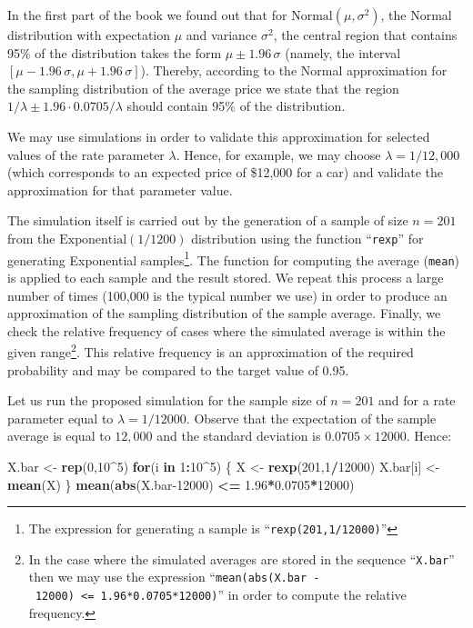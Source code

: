 \documentclass[]{krantz}
\makeatletter
\newenvironment{Shaded}{\begin{snugshade}}{\end{snugshade}}
\newcommand{\ControlFlowTok}[1]{\textcolor[rgb]{0.13,0.29,0.53}{\textbf{#1}}}
\newcommand{\DecValTok}[1]{\textcolor[rgb]{0.00,0.00,0.81}{#1}}
\newcommand{\FloatTok}[1]{\textcolor[rgb]{0.00,0.00,0.81}{#1}}
\newcommand{\KeywordTok}[1]{\textcolor[rgb]{0.13,0.29,0.53}{\textbf{#1}}}
\newcommand{\NormalTok}[1]{#1}
\newcommand{\OperatorTok}[1]{\textcolor[rgb]{0.81,0.36,0.00}{\textbf{#1}}}
\newcommand{\StringTok}[1]{\textcolor[rgb]{0.31,0.60,0.02}{#1}}
\newenvironment{kframe}{%
\medskip{}
\setlength{\fboxsep}{.8em}
 \def\at@end@of@kframe{}%
 \ifinner\ifhmode%
  \def\at@end@of@kframe{\end{minipage}}%
  \begin{minipage}{\columnwidth}%
 \fi\fi%
 \def\FrameCommand##1{\hskip\@totalleftmargin \hskip-\fboxsep
 \colorbox{shadecolor}{##1}\hskip-\fboxsep
     \hskip-\linewidth \hskip-\@totalleftmargin \hskip\columnwidth}%
 \MakeFramed {\advance\hsize-\width
   \@totalleftmargin\z@ \linewidth\hsize
   \@setminipage}}%
 {\par\unskip\endMakeFramed%
 \at@end@of@kframe}
\renewenvironment{Shaded}{\begin{kframe}}{\end{kframe}}
\theoremstyle{definition}
\theoremstyle{definition}
\theoremstyle{definition}
\theoremstyle{remark}
\makeatother
\begin{document}
In the first part of the book we found out that for
\(\mathrm{Normal}(\mu,\sigma^2)\), the Normal distribution with
expectation \(\mu\) and variance \(\sigma^2\), the central region that
contains 95\% of the distribution takes the form \(\mu \pm 1.96\, \sigma\)
(namely, the interval \([\mu-1.96\,\sigma,\mu + 1.96\, \sigma]\)).
Thereby, according to the Normal approximation for the sampling
distribution of the average price we state that the region
\(1/\lambda \pm 1.96 \cdot 0.0705/\lambda\) should contain 95\% of the
distribution.

We may use simulations in order to validate this approximation for
selected values of the rate parameter \(\lambda\). Hence, for example, we
may choose \(\lambda = 1/12,000\) (which corresponds to an expected price
of \$12,000 for a car) and validate the approximation for that parameter
value.

The simulation itself is carried out by the generation of a sample of
size \(n=201\) from the \(\mathrm{Exponential}(1/1200)\) distribution using
the function ``\texttt{rexp}'' for generating Exponential samples\footnote{The expression for generating a sample is ``\texttt{rexp(201,1/12000)}''}. The
function for computing the average (\texttt{mean}) is applied to each sample
and the result stored. We repeat this process a large number of times
(100,000 is the typical number we use) in order to produce an
approximation of the sampling distribution of the sample average.
Finally, we check the relative frequency of cases where the simulated
average is within the given range\footnote{In the case where the simulated averages are stored in the
  sequence ``\texttt{X.bar}'' then we may use the expression
  ``\texttt{mean(abs(X.bar\ -\ 12000)\ \textless{}=\ 1.96*0.0705*12000)}'' in order to
  compute the relative frequency.}. This relative frequency is an
approximation of the required probability and may be compared to the
target value of 0.95.

Let us run the proposed simulation for the sample size of \(n=201\) and
for a rate parameter equal to \(\lambda = 1/12000\). Observe that the
expectation of the sample average is equal to \(12,000\) and the standard
deviation is \(0.0705\times 12000\). Hence:

\begin{Shaded}
\begin{Highlighting}[]
\NormalTok{X.bar <-}\StringTok{ }\KeywordTok{rep}\NormalTok{(}\DecValTok{0}\NormalTok{,}\DecValTok{10}\OperatorTok{^}\DecValTok{5}\NormalTok{)}
\ControlFlowTok{for}\NormalTok{(i }\ControlFlowTok{in} \DecValTok{1}\OperatorTok{:}\DecValTok{10}\OperatorTok{^}\DecValTok{5}\NormalTok{) \{}
\NormalTok{  X <-}\StringTok{ }\KeywordTok{rexp}\NormalTok{(}\DecValTok{201}\NormalTok{,}\DecValTok{1}\OperatorTok{/}\DecValTok{12000}\NormalTok{)}
\NormalTok{  X.bar[i] <-}\StringTok{ }\KeywordTok{mean}\NormalTok{(X)}
\NormalTok{\}}
\KeywordTok{mean}\NormalTok{(}\KeywordTok{abs}\NormalTok{(X.bar}\DecValTok{-12000}\NormalTok{) }\OperatorTok{<=}\StringTok{ }\FloatTok{1.96}\OperatorTok{*}\FloatTok{0.0705}\OperatorTok{*}\DecValTok{12000}\NormalTok{)}
\end{Highlighting}
\end{Shaded}
\end{document}
